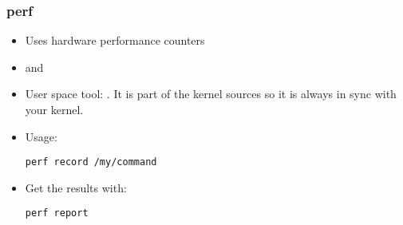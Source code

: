 \begin{frame}[fragile]
\frametitle{perf}
\begin{itemize}
	\item Uses hardware performance counters
	\item {} and 
	\item User space tool: . It is part of the kernel
		sources so it is always in sync with your kernel.
	\item Usage:
	\begin{block}{}
\begin{verbatim}
perf record /my/command
\end{verbatim}
	\end{block}
	\item Get the results with:
	\begin{block}{}
\begin{verbatim}
perf report
\end{verbatim}
	\end{block}
\end{itemize}
\end{frame}

